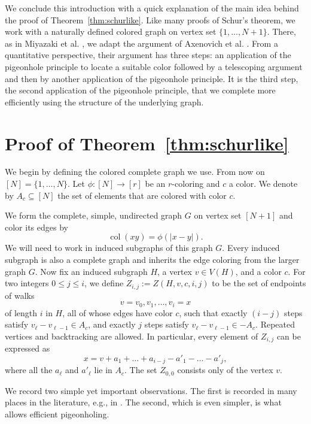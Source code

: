 \documentclass[11pt]{article}
\theoremstyle{plain}
\theoremstyle{definition}
\theoremstyle{definition}
\theoremstyle{remark}
\newcommand{\col}{\operatorname{col}}
\begin{document}
We conclude this introduction with a quick explanation of the main idea behind the proof of Theorem~\ref{thm:schurlike}. Like many proofs of Schur's theorem, we work with a naturally defined colored graph on vertex set $\{1,\dots, N+1\}$. There, as in Miyazaki et al. \cite{MMPZ2026}, we adapt the argument of Axenovich et al. \cite{ACJMR2026}. From a quantitative perspective, their argument has three steps: an application of the pigeonhole principle to locate a suitable color followed by a telescoping argument and then by another application of the pigeonhole principle. It is the third step, the second application of the pigeonhole principle, that we complete more efficiently using the structure of the underlying graph.



\section[Proof of Theorem 1]{Proof of Theorem~\ref{thm:schurlike}}

We begin by defining the colored complete graph we use. From now on $[N] = \{1, \dots, N\}$. Let
\(
  \phi:[N]\longrightarrow[r]
\)
be an $r$-coloring and $c$ a color. We denote by  \(A_{c} \subseteq [N]\) the set of elements that are colored with color \(c\).

We form the complete, simple, undirected graph $G$ on vertex set $[N+1]$ and color its edges by
\[
  \col(xy)=\phi(|x-y|).
\]
We will need to work in induced subgraphs of this graph $G$. Every induced subgraph is also a complete graph and inherits the edge coloring from the larger graph $G$. Now fix an induced subgraph \(H\), a vertex \(v \in V(H)\), and a color \(c\). For two integers \(0\leq j\leq i\), we define \(Z_{i,j}:= Z(H,v,c,i,j)\) to be the set of endpoints of walks 
\[
  v=v_0,v_1,\ldots,v_i=x
\] 
of length $i$ in $H$, all of whose edges have color $c$, such that exactly $(i-j)$ steps satisfy $v_\ell-v_{\ell-1}\in A_c$, and exactly $j$ steps satisfy $v_\ell-v_{\ell-1}\in -A_c$. Repeated vertices and backtracking are allowed. In particular, every element of $Z_{i,j}$ can be expressed as
\begin{equation}  
 x=v+a_{1}+\dots+a_{i-j}-a'_{1}-\dots-a'_{j},
\label{eq:charge-rep}
\end{equation}
where all the \(a_\ell\) and \(a'_\ell\) lie in \(A_c\). The set \(Z_{0,0}\) consists only of the vertex \(v\).

We record two simple yet important observations. The first is recorded in many places in the literature, e.g., in \cite{Kosciuszko2025}. The second, which is even simpler, is what allows efficient pigeonholing.
\end{document}

